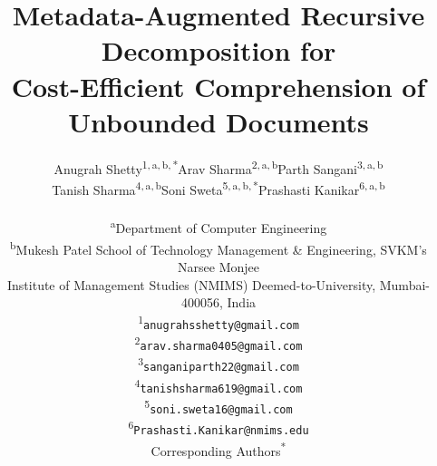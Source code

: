\documentclass[conference]{IEEEtran}
\begin{document}
\title{Metadata-Augmented Recursive Decomposition for\\
Cost-Efficient Comprehension of Unbounded Documents}

\author{%
\begin{tabular}{@{}*{3}{>{\centering\arraybackslash}p{}}@{}}
Anugrah Shetty\textsuperscript{1,\,a,\,b,\,*} &
Arav Sharma\textsuperscript{2,\,a,\,b} &
Parth Sangani\textsuperscript{3,\,a,\,b} \\[6pt]
Tanish Sharma\textsuperscript{4,\,a,\,b} &
Soni Sweta\textsuperscript{5,\,a,\,b,\,*} &
Prashasti Kanikar\textsuperscript{6,\,a,\,b}
\end{tabular}\\[4pt]
{\footnotesize\textsuperscript{a}Department of Computer Engineering}\\[1pt]
{\footnotesize\textsuperscript{b}Mukesh Patel School of Technology Management \& Engineering, SVKM's Narsee Monjee}\\[1pt]
{\footnotesize Institute of Management Studies (NMIMS) Deemed-to-University, Mumbai-400056, India}\\[4pt]
{\footnotesize\textsuperscript{1}\texttt{anugrahsshetty@gmail.com}}\\[1pt]
{\footnotesize\textsuperscript{2}\texttt{arav.sharma0405@gmail.com}}\\[1pt]
{\footnotesize\textsuperscript{3}\texttt{sanganiparth22@gmail.com}}\\[1pt]
{\footnotesize\textsuperscript{4}\texttt{tanishsharma619@gmail.com}}\\[1pt]
{\footnotesize\textsuperscript{5}\texttt{soni.sweta16@gmail.com}}\\[1pt]
{\footnotesize\textsuperscript{6}\texttt{Prashasti.Kanikar@nmims.edu}}\\[2pt]
{\footnotesize Corresponding Authors\textsuperscript{*}}%
}
\maketitle
\end{document}
